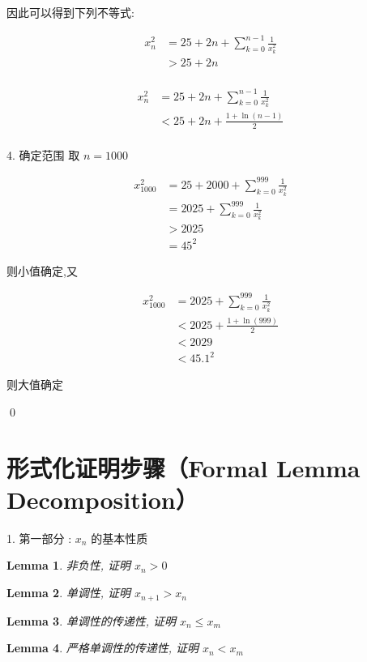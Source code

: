 \documentclass[11pt]{article}
\newtheorem{lemma}{Lemma}
\begin{document}
因此可以得到下列不等式:

\begin{align}
    x_{n}^2 & = 25 + 2n + \sum_{k=0}^{n-1}\frac{1}{x_k^2}\\
    & > 25 + 2n \\
\end{align}

\begin{align}
    x_{n}^2 & = 25 + 2n + \sum_{k=0}^{n-1}\frac{1}{x_k^2}\\
    & < 25 + 2n + \frac{1 + \ln (n-1)}{2}\\
\end{align}

4. 确定范围 取 $n = 1000$

\begin{align}
x_{1000}^2 & = 25 + 2000 + \sum_{k=0}^{999}\frac{1}{x_k^2}\\
& = 2025 + \sum_{k=0}^{999}\frac{1}{x_k^2} \\
& > 2025 \\
& = 45^2
\end{align}

则小值确定,又

\begin{align}
x_{1000}^2 & = 2025 + \sum_{k=0}^{999}\frac{1}{x_k^2} \\
& < 2025 + \frac{1 + \ln (999)}{2} \\
& < 2029 \\ 
& < 45.1^2
\end{align}

则大值确定

\qed


\section*{形式化证明步骤（Formal Lemma Decomposition）}

1. 第一部分 : $x_n$ 的基本性质
\begin{lemma}
    非负性,
    证明 $x_n > 0$
\end{lemma}

\begin{lemma}
    单调性,
    证明 $x_{n+1} > x_n$
\end{lemma}

\begin{lemma}
    单调性的传递性,
    证明 $x_n ≤ x_m$
\end{lemma}

\begin{lemma}
    严格单调性的传递性,
    证明 $x_n < x_m$
\end{lemma}
\end{document}
